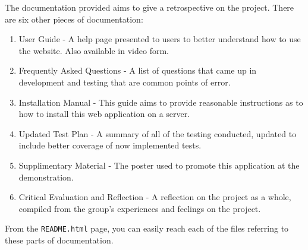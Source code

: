 \documentclass[10pt]{article}
\begin{document}
The documentation provided aims to give a retrospective on the project. There are six other pieces of documentation:

\begin{enumerate}
\item User Guide - A help page presented to users to better understand how to use the website. Also available in video form.
\item Frequently Asked Questions - A list of questions that came up in development and testing that are common points of error.
\item Installation Manual - This guide aims to provide reasonable instructions as to how to install this web application on a server.
\item Updated Test Plan - A summary of all of the testing conducted, updated to include better coverage of now implemented tests.
\item Supplimentary Material - The poster used to promote this application at the demonstration.
\item Critical Evaluation and Reflection - A reflection on the project as a whole, compiled from the group's experiences and feelings on the project.
\end{enumerate}

From the \verb+README.html+ page, you can easily reach each of the files referring to these parts of documentation.
\end{document}
